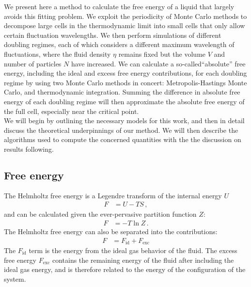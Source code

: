 \documentclass[12pt]{article}
\begin{document}
We present here a method to calculate the free energy of a liquid that largely avoids this fitting problem. We exploit the periodicity of Monte Carlo methods to decompose large cells in the thermodynamic limit into small cells that only allow certain fluctuation wavelengths. We then perform simulations of different doubling regimes, each of which considers a different maximum wavelength of fluctuations, where the fluid density $\eta$ remains fixed but the volume $V$ and number of particles $N$ have increased. We can calculate a so-called``absolute'' free energy, including the ideal and excess free energy contributions, for each doubling regime by using two Monte Carlo methods in concert: Metropolis-Hastings Monte Carlo, and thermodynamic integration. Summing the difference in absolute free energy of each doubling regime will then approximate the absolute free energy of the full cell, especially near the critical point. \\

We will begin by outlining the necessary models for this work, and then in detail discuss the theoretical underpinnings of our method. We will then describe the algorithms used to compute the concerned quantities with the the discussion on results following. 

\subsection{Free energy}
The Helmholtz free energy is a Legendre transform of the internal energy $U$
\begin{align}
    F &= U - TS\, ,
    \label{Fdef}
\end{align}
and can be calculated given the ever-pervasive partition function $Z$:
\begin{align}
    F &= -T \ln Z\, .
    \label{FdefSM}
\end{align}
The Helmholtz free energy can also be separated into the contributions:
\begin{align}
    F &= F_{\text{id}} + F_{\text{exc}}
    \label{F_abs}
\end{align} 
The $F_{\text{id}}$ term is the energy from the ideal gas behavior of the fluid. The excess free energy $F_{\text{exc}}$ contains the remaining energy of the fluid after including the ideal gas energy, and is therefore related to the energy of the configuration of the system.\\
\end{document}

